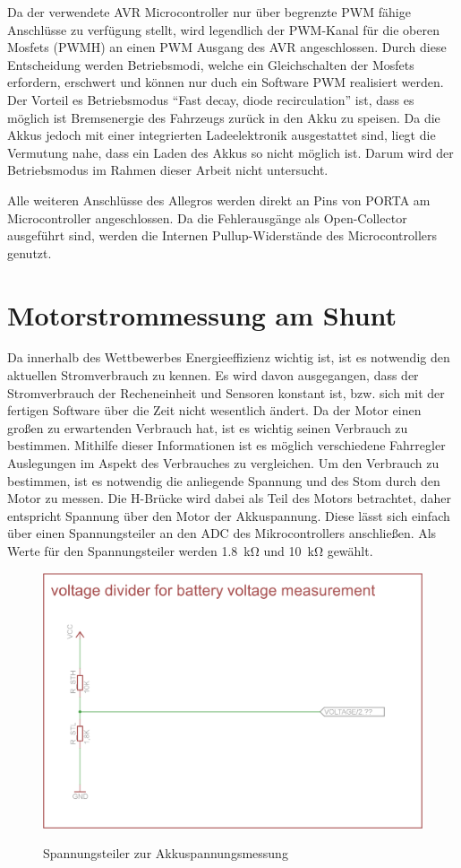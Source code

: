 Da der verwendete AVR Microcontroller nur über begrenzte PWM fähige Anschlüsse zu verfügung stellt, wird legendlich der PWM-Kanal für die oberen Mosfets (PWMH) an einen PWM Ausgang des AVR angeschlossen.
Durch diese Entscheidung werden Betriebsmodi, welche ein Gleichschalten der Mosfets erfordern, erschwert und können nur duch ein Software PWM realisiert werden. Der Vorteil es Betriebsmodus ``Fast decay, diode recirculation''
ist, dass es möglich ist Bremsenergie des Fahrzeugs zurück in den Akku zu speisen. Da die Akkus jedoch mit einer integrierten Ladeelektronik ausgestattet sind, liegt die Vermutung nahe, dass ein Laden des Akkus so nicht möglich ist.
Darum wird der Betriebsmodus im Rahmen dieser Arbeit nicht untersucht.

Alle weiteren Anschlüsse des Allegros werden direkt an Pins von PORTA am Microcontroller angeschlossen. Da die Fehlerausgänge als Open-Collector ausgeführt sind, werden die Internen Pullup-Widerstände des Microcontrollers genutzt.

\section{Motorstrommessung am Shunt}

Da innerhalb des Wettbewerbes Energieeffizienz wichtig ist, ist es notwendig den aktuellen Stromverbrauch zu kennen. Es wird davon ausgegangen, dass der Stromverbrauch der Recheneinheit und Sensoren
konstant ist, bzw. sich mit der fertigen Software über die Zeit nicht wesentlich ändert. Da der Motor einen großen zu erwartenden Verbrauch hat, ist es wichtig seinen Verbrauch zu bestimmen. Mithilfe dieser
Informationen ist es möglich verschiedene Fahrregler Auslegungen im Aspekt des Verbrauches zu vergleichen. Um den Verbrauch zu bestimmen, ist es notwendig die anliegende Spannung und des Stom durch den
Motor zu messen. Die H-Brücke wird dabei als Teil des Motors betrachtet, daher entspricht Spannung über den Motor der Akkuspannung. Diese lässt sich einfach über einen Spannungsteiler an den ADC des Mikrocontrollers
anschließen. Als Werte für den Spannungsteiler werden \SI{1,8}{\kohm} und \SI{10}{\kohm} gewählt.

\begin{figure}[H]
\centering
\includegraphics[width=.8\textwidth]{spannungsteiler.png}\\
\caption{Spannungsteiler zur Akkuspannungsmessung}%
\label{fig:Spannungsteiler}
\end{figure}


